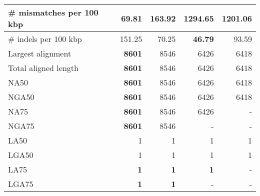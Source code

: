 \documentclass[12pt,a4paper]{article}
\begin{document}
\begin{table}[ht]
\begin{center}
\begin{tabular}{|l*{4}{|r}|}
\# mismatches per 100 kbp & {\bf 69.81} & 163.92 & 1294.65 & 1201.06 \\ \hline
\# indels per 100 kbp & 151.25 & 70.25 & {\bf 46.79} & 93.59 \\ \hline
Largest alignment & {\bf 8601} & 8546 & 6426 & 6418 \\ \hline
Total aligned length & {\bf 8601} & 8546 & 6426 & 6418 \\ \hline
NA50 & {\bf 8601} & 8546 & 6426 & 6418 \\ \hline
NGA50 & {\bf 8601} & 8546 & 6426 & 6418 \\ \hline
NA75 & {\bf 8601} & 8546 & 6426 & - \\ \hline
NGA75 & {\bf 8601} & 8546 & - & - \\ \hline
LA50 & 1 & 1 & 1 & 1 \\ \hline
LGA50 & 1 & 1 & 1 & 1 \\ \hline
LA75 & {\bf 1} & {\bf 1} & {\bf 1} & - \\ \hline
LGA75 & {\bf 1} & {\bf 1} & - & - \\ \hline
\end{tabular}
\end{center}
\end{table}
\end{document}
